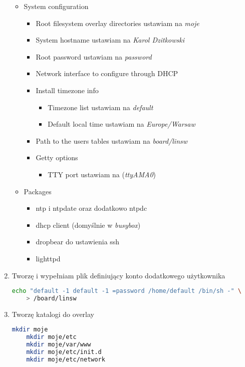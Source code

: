 \begin{enumerate}
\begin{itemize}
		\item System configuration
		\begin{itemize}
			\item Root filesystem overlay directories ustawiam na \emph{moje}
			\item System hostname ustawiam na \emph{Karol Dzitkowski}
			\item Root password ustawiam na \emph{password}
			\item Network interface to configure through DHCP
			\item Install timezone info
				\begin{itemize}
				\item Timezone list ustawiam na \emph{default}
				\item Default local time ustawiam na \emph{Europe/Warsaw}
				\end{itemize}
			\item Path to the users tables ustawiam na \emph{board/linsw}
			\item Getty options 
			\begin{itemize}
				\item TTY port ustawiam na (\emph{ttyAMA0})
			\end{itemize}
		\end{itemize}
		
		\item Packages 
		\begin{itemize}
			\item ntp i ntpdate oraz dodatkowo ntpdc
			\item dhcp client (domyślnie w \emph{busybox})
			\item dropbear do ustawienia ssh
			\item lighttpd
		\end{itemize}
	\end{itemize}
	
	\item Tworzę i wypełniam plik definiujący konto dodatkowego użytkownika
	\begin{lstlisting}[language=bash]
	echo "default -1 default -1 =password /home/default /bin/sh -" \
	> /board/linsw
	\end{lstlisting}	
		
	\item Tworzę katalogi do overlay
	\begin{lstlisting}[language=bash]
	mkdir moje
	mkdir moje/etc
	mkdir moje/var/www
	mkdir moje/etc/init.d
	mkdir moje/etc/network
	\end{lstlisting}	
	

\end{enumerate}
